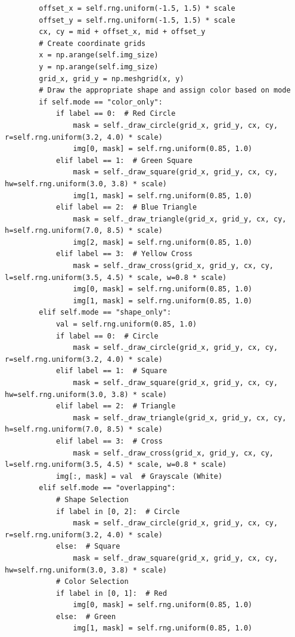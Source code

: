 \documentclass[12pt, a4paper, oneside]{report}
\begin{document}
\begin{verbatim}
        offset_x = self.rng.uniform(-1.5, 1.5) * scale
        offset_y = self.rng.uniform(-1.5, 1.5) * scale
        cx, cy = mid + offset_x, mid + offset_y
        # Create coordinate grids
        x = np.arange(self.img_size)
        y = np.arange(self.img_size)
        grid_x, grid_y = np.meshgrid(x, y)
        # Draw the appropriate shape and assign color based on mode
        if self.mode == "color_only":
            if label == 0:  # Red Circle
                mask = self._draw_circle(grid_x, grid_y, cx, cy, r=self.rng.uniform(3.2, 4.0) * scale)
                img[0, mask] = self.rng.uniform(0.85, 1.0)
            elif label == 1:  # Green Square
                mask = self._draw_square(grid_x, grid_y, cx, cy, hw=self.rng.uniform(3.0, 3.8) * scale)
                img[1, mask] = self.rng.uniform(0.85, 1.0)
            elif label == 2:  # Blue Triangle
                mask = self._draw_triangle(grid_x, grid_y, cx, cy, h=self.rng.uniform(7.0, 8.5) * scale)
                img[2, mask] = self.rng.uniform(0.85, 1.0)
            elif label == 3:  # Yellow Cross
                mask = self._draw_cross(grid_x, grid_y, cx, cy, l=self.rng.uniform(3.5, 4.5) * scale, w=0.8 * scale)
                img[0, mask] = self.rng.uniform(0.85, 1.0)
                img[1, mask] = self.rng.uniform(0.85, 1.0)
        elif self.mode == "shape_only":
            val = self.rng.uniform(0.85, 1.0)
            if label == 0:  # Circle
                mask = self._draw_circle(grid_x, grid_y, cx, cy, r=self.rng.uniform(3.2, 4.0) * scale)
            elif label == 1:  # Square
                mask = self._draw_square(grid_x, grid_y, cx, cy, hw=self.rng.uniform(3.0, 3.8) * scale)
            elif label == 2:  # Triangle
                mask = self._draw_triangle(grid_x, grid_y, cx, cy, h=self.rng.uniform(7.0, 8.5) * scale)
            elif label == 3:  # Cross
                mask = self._draw_cross(grid_x, grid_y, cx, cy, l=self.rng.uniform(3.5, 4.5) * scale, w=0.8 * scale)
            img[:, mask] = val  # Grayscale (White)
        elif self.mode == "overlapping":
            # Shape Selection
            if label in [0, 2]:  # Circle
                mask = self._draw_circle(grid_x, grid_y, cx, cy, r=self.rng.uniform(3.2, 4.0) * scale)
            else:  # Square
                mask = self._draw_square(grid_x, grid_y, cx, cy, hw=self.rng.uniform(3.0, 3.8) * scale)
            # Color Selection
            if label in [0, 1]:  # Red
                img[0, mask] = self.rng.uniform(0.85, 1.0)
            else:  # Green
                img[1, mask] = self.rng.uniform(0.85, 1.0)

\end{verbatim}
\end{document}
